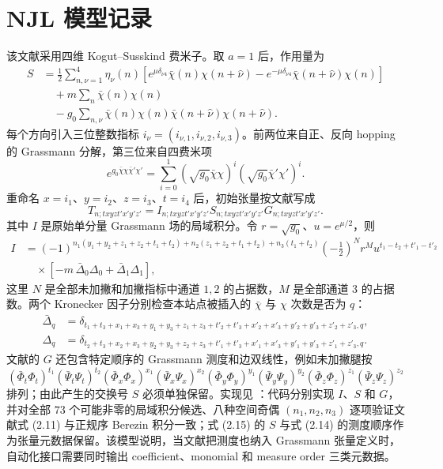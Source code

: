 \documentclass[UTF8,11pt]{ctexart}
\begin{document}
\section{NJL 模型记录}
该文献采用四维 Kogut--Susskind 费米子。取 $a=1$ 后，作用量为
\begin{align}
 S&=\frac12\sum_{n,\nu=1}^{4}\eta_\nu(n)
 \left[e^{\mu\delta_{\nu4}}\bar\chi(n)\chi(n+\hat\nu)
 -e^{-\mu\delta_{\nu4}}\bar\chi(n+\hat\nu)\chi(n)\right]\\
 &\quad +m\sum_n\bar\chi(n)\chi(n)\\
 &\quad -g_0\sum_{n,\nu}\bar\chi(n)\chi(n)
 \bar\chi(n+\hat\nu)\chi(n+\hat\nu).
\end{align}
每个方向引入三位整数指标 $i_\nu=(i_{\nu,1},i_{\nu,2},i_{\nu,3})$。前两位来自正、反向 hopping 的 Grassmann 分解，第三位来自四费米项
\begin{equation}
 e^{g_0\bar\chi\chi\bar\chi'\chi'}=
 \sum_{i=0}^{1}\left(\sqrt{g_0}\bar\chi\chi\right)^i
 \left(\sqrt{g_0}\bar\chi'\chi'\right)^i.
\end{equation}
重命名 $x=i_1$、$y=i_2$、$z=i_3$、$t=i_4$ 后，初始张量按文献写成
\begin{equation}
 T_{n;txyzt'x'y'z'}=I_{n;txyzt'x'y'z'}S_{n;txyzt'x'y'z'}G_{n;txyzt'x'y'z'}.
\end{equation}
其中 $I$ 是原始单分量 Grassmann 场的局域积分。令 $r=\sqrt{g_0}$、$u=e^{\mu/2}$，则
\begin{align}
 I&=(-1)^{n_1(y_1+y_2+z_1+z_2+t_1+t_2)+n_2(z_1+z_2+t_1+t_2)+n_3(t_1+t_2)}
 \left(-\frac12\right)^N r^M u^{t_1-t_2+t'_1-t'_2} \\
 &\quad\times\left[-m\,\bar\Delta_0\Delta_0+\bar\Delta_1\Delta_1\right],
\end{align}
这里 $N$ 是全部未加撇和加撇指标中通道 $1,2$ 的占据数，$M$ 是全部通道 $3$ 的占据数。两个 Kronecker 因子分别检查本站点被插入的 $\bar\chi$ 与 $\chi$ 次数是否为 $q$：
\begin{align}
 \bar\Delta_q&=\delta_{t_1+t_3+x_1+x_3+y_1+y_3+z_1+z_3+t'_2+t'_3+x'_2+x'_3+y'_2+y'_3+z'_2+z'_3,q},\\
 \Delta_q&=\delta_{t_2+t_3+x_2+x_3+y_2+y_3+z_2+z_3+t'_1+t'_3+x'_1+x'_3+y'_1+y'_3+z'_1+z'_3,q}.
\end{align}
文献的 $G$ 还包含特定顺序的 Grassmann 测度和边双线性，例如未加撇腿按
\begin{equation}
 (\bar\Phi_t\Phi_t)^{t_1}(\bar\Psi_t\Psi_t)^{t_2}
 (\bar\Phi_x\Phi_x)^{x_1}(\bar\Psi_x\Psi_x)^{x_2}
 (\bar\Phi_y\Phi_y)^{y_1}(\bar\Psi_y\Psi_y)^{y_2}
 (\bar\Phi_z\Phi_z)^{z_1}(\bar\Psi_z\Psi_z)^{z_2}
\end{equation}
排列；由此产生的交换号 $S$ 必须单独保留。实现见 ：代码分别实现 $I$、$S$ 和 $G$，并对全部 $73$ 个可能非零的局域积分候选、八种空间奇偶 $(n_1,n_2,n_3)$ 逐项验证文献式 (2.11) 与正规序 Berezin 积分一致；式 (2.15) 的 $S$ 与式 (2.14) 的测度顺序作为张量元数据保留。该模型说明，当文献把测度也纳入 Grassmann 张量定义时，自动化接口需要同时输出 coefficient、monomial 和 measure order 三类元数据。
\end{document}
